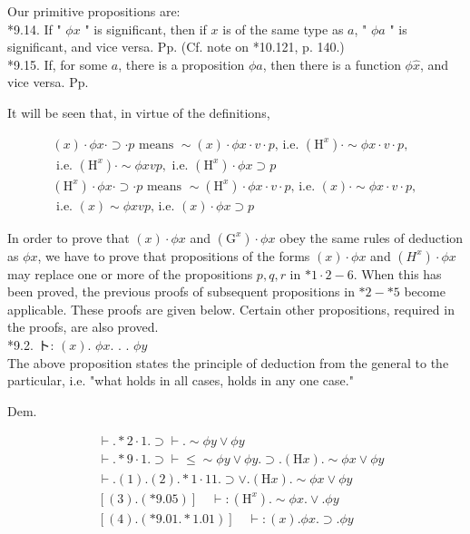 \documentclass[10pt]{article}
\begin{document}
Our primitive propositions are:\\
*9.14. If " $\phi x$ " is significant, then if $x$ is of the same type as $a$, " $\phi a$ " is significant, and vice versa. Pp. (Cf. note on *10.121, p. 140.)\\
*9.15. If, for some $a$, there is a proposition $\phi a$, then there is a function $\phi \hat{x}$, and vice versa. Pp.

It will be seen that, in virtue of the definitions,

$$
\begin{gathered}
(x) \cdot \phi x \cdot \supset \cdot p \text { means } \sim(x) \cdot \phi x \cdot v \cdot p \text {, i.e. }\left(\mathrm{H}^{x}\right) \cdot \sim \phi x \cdot v \cdot p \text {, } \\
\text { i.e. }\left(\mathrm{H}^{x}\right) \cdot \sim \phi x v p, \text { i.e. }\left(\mathrm{H}^{x}\right) \cdot \phi x \supset p \\
\left(\mathrm{H}^{x}\right) \cdot \phi x \cdot \supset \cdot p \text { means } \sim\left(\mathrm{H}^{x}\right) \cdot \phi x \cdot v \cdot p \text {, i.e. }(x) \cdot \sim \phi x \cdot v \cdot p \text {, } \\
\text { i.e. }(x) \sim \phi x v p \text {, i.e. }(x) \cdot \phi x \supset p
\end{gathered}
$$

In order to prove that $(x) \cdot \phi x$ and $\left(\mathrm{G}^{x}\right) \cdot \phi x$ obey the same rules of deduction as $\phi x$, we have to prove that propositions of the forms $(x) \cdot \phi x$ and $\left(H^{x}\right) \cdot \phi x$ may replace one or more of the propositions $p, q, r$ in $* 1 \cdot 2-6$. When this has been proved, the previous proofs of subsequent propositions in $* 2-* 5$ become applicable. These proofs are given below. Certain other propositions, required in the proofs, are also proved.\\
*9.2. ト: $(x)$. $\phi x$. . . $\phi y$\\
The above proposition states the principle of deduction from the general to the particular, i.e. "what holds in all cases, holds in any one case."

Dem.


\begin{align*}
& \vdash . * 2 \cdot 1 . \supset \vdash . \sim \phi y \vee \phi y  \tag{1}\\
& \vdash . * 9 \cdot 1 . \supset \vdash \leqslant \sim \phi y \vee \phi y . \supset .(\mathrm{H} x) . \sim \phi x \vee \phi y  \tag{2}\\
& \vdash .(1) .(2) . * 1 \cdot 11 . \supset \vee .(\mathrm{H} x) . \sim \phi x \vee \phi y  \tag{3}\\
& {[(3) .(* 9.05)] \quad \vdash:\left(\mathrm{H}^{x}\right) . \sim \phi x . \vee . \phi y}  \tag{4}\\
& {[(4) .(* 9.01 . * 1.01)] \quad \vdash:(x) . \phi x . \supset . \phi y}
\end{align*}
\end{document}
